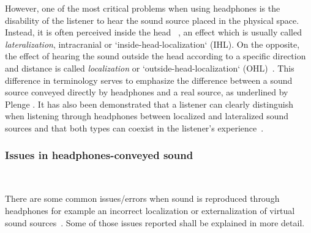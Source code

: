 \documentclass[journal]{IEEEtran}
\begin{document}
However, one of the most critical problems when using headphones is the disability of the listener to hear the sound source placed in the physical space. Instead, it is often perceived inside the head ~\cite{harma2004}, an effect which is usually called \emph{lateralization}, intracranial or `inside-head-localization` (IHL). On the opposite, the effect of hearing the sound outside the head according to a specific direction and distance is called \emph{localization} or `outside-head-localization` (OHL)~\cite{plenge1972}. This difference in terminology serves to emphasize the difference between a sound source conveyed directly by headphones and a real source, as underlined by Plenge \cite{plenge1972}. It has also been demonstrated that a listener can clearly distinguish when listening through headphones between localized and lateralized sound sources and that both types can coexist in the listener's experience~\cite{harma2004}.\\


\subsubsection*{Issues in headphones-conveyed sound}~

There are some common issues/errors when sound is reproduced through headphones for example an incorrect localization or externalization of virtual sound sources~\cite{harma2004}. Some of those issues reported shall be explained in more detail.
\end{document}
